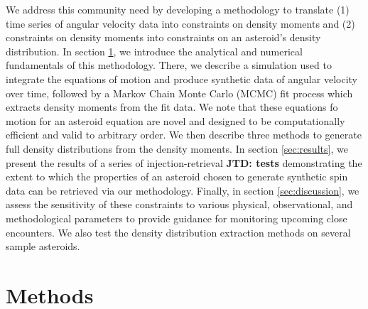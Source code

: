 \documentclass[fleqn,usenatbib]{mnras}
\newcommand{\jtd}[1]{ {\bf{\color{red} JTD: #1}} }
\begin{document}
We address this community need by developing a methodology to translate (1) time series of angular velocity data into constraints on density moments and (2) constraints on density moments into constraints on an asteroid's density distribution. In section \ref{sec:methods}, we introduce the analytical and numerical fundamentals of this methodology. There, we describe a simulation used to integrate the equations of motion and produce synthetic data of angular velocity over time, followed by a Markov Chain Monte Carlo (MCMC) fit process which  extracts density moments from the fit data. We note that these equations fo motion for an asteroid equation are novel and designed to be computationally efficient and valid to arbitrary order. We then describe three methods to generate full density distributions from the density moments. In section \ref{sec:results}, we present the results of a series of injection-retrieval \jtd{tests} demonstrating the extent to which the properties of an asteroid chosen to generate synthetic spin data can be retrieved via our methodology. Finally, in section \ref{sec:discussion}, we assess the sensitivity of these constraints to various physical, observational, and methodological parameters to provide guidance for monitoring upcoming close encounters. We also test the density distribution extraction methods on several sample asteroids.





\section{Methods}
\label{sec:methods}
\end{document}
